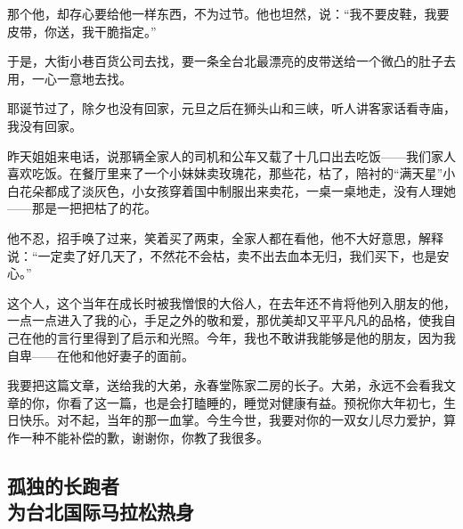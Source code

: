 \par 那个他，却存心要给他一样东西，不为过节。他也坦然，说：“我不要皮鞋，我要皮带，你送，我干脆指定。”
\par 于是，大街小巷百货公司去找，要一条全台北最漂亮的皮带送给一个微凸的肚子去用，一心一意地去找。
\par 耶诞节过了，除夕也没有回家，元旦之后在狮头山和三峡，听人讲客家话看寺庙，我没有回家。
\par 昨天姐姐来电话，说那辆全家人的司机和公车又载了十几口出去吃饭——我们家人喜欢吃饭。在餐厅里来了一个小妹妹卖玫瑰花，那些花，枯了，陪衬的“满天星”小白花朵都成了淡灰色，小女孩穿着国中制服出来卖花，一桌一桌地走，没有人理她——那是一把把枯了的花。
\par 他不忍，招手唤了过来，笑着买了两束，全家人都在看他，他不大好意思，解释说：“一定卖了好几天了，不然花不会枯，卖不出去血本无归，我们买下，也是安心。”
\par 这个人，这个当年在成长时被我憎恨的大俗人，在去年还不肯将他列入朋友的他，一点一点进入了我的心，手足之外的敬和爱，那优美却又平平凡凡的品格，使我自己在他的言行里得到了启示和光照。今年，我也不敢讲我能够是他的朋友，因为我自卑——在他和他好妻子的面前。
\par 我要把这篇文章，送给我的大弟，永春堂陈家二房的长子。大弟，永远不会看我文章的你，你看了这一篇，也是会打瞌睡的，睡觉对健康有益。预祝你大年初七，生日快乐。对不起，当年的那一血掌。今生今世，我要对你的一双女儿尽力爱护，算作一种不能补偿的歉，谢谢你，你教了我很多。


\subsection{孤独的长跑者\\\small{为台北国际马拉松热身}}


